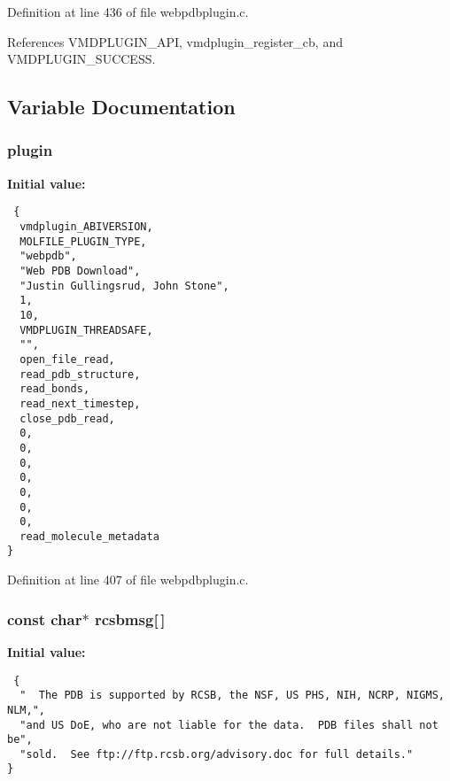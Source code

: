 Definition at line 436 of file webpdbplugin.c.

References VMDPLUGIN\_\-API, vmdplugin\_\-register\_\-cb, and VMDPLUGIN\_\-SUCCESS.

\subsection{Variable Documentation}
\subsubsection{ plugin\hspace{0.3cm}{\tt  [static]}}\label{webpdbplugin_8c_a2}


{\bf Initial value:}

\footnotesize\begin{verbatim} {
  vmdplugin_ABIVERSION,             
  MOLFILE_PLUGIN_TYPE,              
  "webpdb",                         
  "Web PDB Download",               
  "Justin Gullingsrud, John Stone", 
  1,                                
  10,                               
  VMDPLUGIN_THREADSAFE,             
  "",                               
  open_file_read,
  read_pdb_structure,
  read_bonds,
  read_next_timestep,
  close_pdb_read,
  0,
  0,
  0,
  0,
  0,
  0,
  0,
  read_molecule_metadata
}\end{verbatim}\normalsize 


Definition at line 407 of file webpdbplugin.c.
\subsubsection{\setlength{\rightskip}{0pt plus 5cm}const char$\ast$ rcsbmsg[$\,$]\hspace{0.3cm}{\tt  [static]}}\label{webpdbplugin_8c_a0}


{\bf Initial value:}

\footnotesize\begin{verbatim} {
  "  The PDB is supported by RCSB, the NSF, US PHS, NIH, NCRP, NIGMS, NLM,",
  "and US DoE, who are not liable for the data.  PDB files shall not be",
  "sold.  See ftp://ftp.rcsb.org/advisory.doc for full details."
}\end{verbatim}\normalsize 


